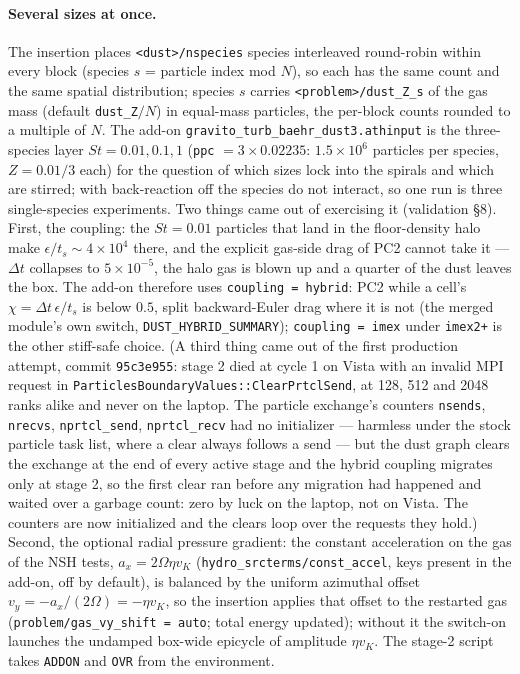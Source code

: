 \documentclass[11pt]{article}
\newcommand{\code}[1]{\texttt{#1}}
\newcommand{\file}[1]{\texttt{\small #1}}
\newcommand{\fn}[1]{\texttt{\small #1}}
\begin{document}
\paragraph{Several sizes at once.} The insertion places \code{<dust>/nspecies} species
interleaved round-robin within every block (species $s$ = particle index mod
$N$), so each has the same count and the same spatial distribution; species $s$ carries
\code{<problem>/dust\_Z\_s} of the gas mass (default \code{dust\_Z}$/N$) in equal-mass
particles, the per-block counts rounded to a multiple of $N$. The add-on
\file{gravito\_turb\_baehr\_dust3.athinput} is the three-species layer $St = 0.01, 0.1,
1$ (\code{ppc} $= 3\times0.02235$: $1.5\times10^6$ particles per species, $Z = 0.01/3$
each) for the question of which sizes lock into the spirals and which are stirred; with
back-reaction off the species do not interact, so one run is three single-species
experiments. Two things came out of exercising it (validation \S8). First, the
coupling: the $St = 0.01$ particles that land in the floor-density halo make
$\epsilon/t_s \sim 4\times10^4$ there, and the explicit gas-side drag of PC2 cannot take
it --- $\Delta t$ collapses to $5\times10^{-5}$, the halo gas is blown up and a quarter
of the dust leaves the box. The add-on therefore uses \code{coupling = hybrid}: PC2
while a cell's $\chi = \Delta t\,\epsilon/t_s$ is below $0.5$, split backward-Euler
drag where it is not (the merged module's own switch, \code{DUST\_HYBRID\_SUMMARY});
\code{coupling = imex} under \code{imex2+} is the other stiff-safe choice. (A third
thing came out of the first production attempt, commit \code{95c3e955}: stage 2 died at
cycle 1 on Vista with an invalid MPI request in \fn{ParticlesBoundaryValues::ClearPrtclSend},
at 128, 512 and 2048 ranks alike and never on the laptop. The particle exchange's
counters \code{nsends}, \code{nrecvs}, \code{nprtcl\_send}, \code{nprtcl\_recv} had no
initializer --- harmless under the stock particle task list, where a clear always
follows a send --- but the dust graph clears the exchange at the end of every active
stage and the hybrid coupling migrates only at stage 2, so the first clear ran before
any migration had happened and waited over a garbage count: zero by luck on the laptop,
not on Vista. The counters are now initialized and the clears loop over the requests
they hold.) Second, the optional radial pressure gradient: the constant acceleration on the gas of the NSH
tests, $a_x = 2\Omega\eta v_K$ (\code{hydro\_srcterms/const\_accel}, keys present in
the add-on, off by default), is balanced by the uniform azimuthal offset $v_y =
-a_x/(2\Omega) = -\eta v_K$, so the insertion applies that offset to the restarted gas
(\code{problem/gas\_vy\_shift = auto}; total energy updated); without it the switch-on
launches the undamped box-wide epicycle of amplitude $\eta v_K$. The stage-2 script
takes \code{ADDON} and \code{OVR} from the environment.
\end{document}
